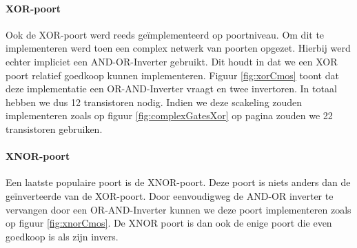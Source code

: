 \paragraph{XOR-poort}
Ook de XOR-poort werd reeds ge\"implementeerd op poortniveau. Om dit te implementeren werd toen een complex netwerk van poorten opgezet. Hierbij werd echter impliciet een AND-OR-Inverter gebruikt. Dit houdt in dat we een XOR poort relatief goedkoop kunnen implementeren. Figuur \ref{fig:xorCmos} toont dat deze implementatie een OR-AND-Inverter vraagt en twee invertoren. In totaal hebben we dus 12 transistoren nodig. Indien we deze scakeling zouden implementeren zoals op figuur \ref{fig:complexGatesXor} op pagina \pageref{fig:complexGatesXor} zouden we 22 transistoren gebruiken.
\paragraph{XNOR-poort}
Een laatste populaire poort is de XNOR-poort. Deze poort is niets anders dan de ge\"inverteerde van de XOR-poort. Door eenvoudigweg de AND-OR inverter te vervangen door een OR-AND-Inverter kunnen we deze poort implementeren zoals op figuur \ref{fig:xnorCmos}. De XNOR poort is dan ook de enige poort die even goedkoop is als zijn invers.
